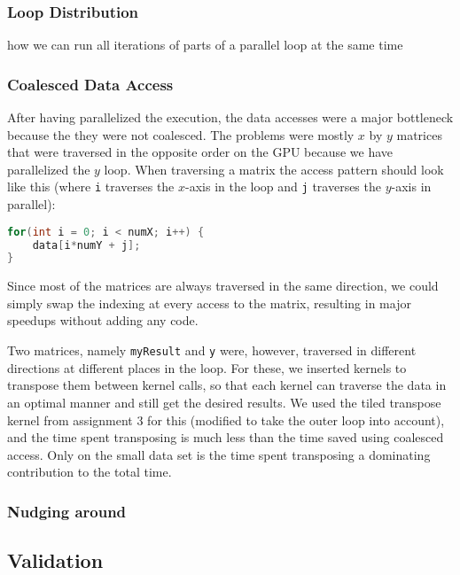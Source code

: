 \documentclass[11pt]{article}
\begin{document}
\subsubsection{Loop Distribution}
how we can run all iterations of parts of a parallel loop at the same time


\subsubsection{Coalesced Data Access}
After having parallelized the execution, the data accesses were a major bottleneck because the they were not coalesced.
The problems were mostly $x$ by $y$ matrices that were traversed in the opposite order on the GPU because we have parallelized the $y$ loop.
When traversing a matrix the access pattern should look like this (where \texttt{i} traverses the $x$-axis in the loop and \texttt{j} traverses the $y$-axis in parallel):
\begin{lstlisting}[language=C]
for(int i = 0; i < numX; i++) {
	data[i*numY + j];
}
\end{lstlisting}

Since most of the matrices are always traversed in the same direction, we could simply swap the indexing at every access to the matrix, resulting in major speedups without adding any code.

Two matrices, namely \texttt{myResult} and \texttt{y} were, however, traversed in different directions at different places in the loop.
For these, we inserted kernels to transpose them between kernel calls, so that each kernel can traverse the data in an optimal manner and still get the desired results.
We used the tiled transpose kernel from assignment 3 for this (modified to take the outer loop into account), and the time spent transposing is much less than the time saved using coalesced access.
Only on the small data set is the time spent transposing a dominating contribution to the total time.


\subsubsection{Nudging around}

\subsection{Validation}
\end{document}
